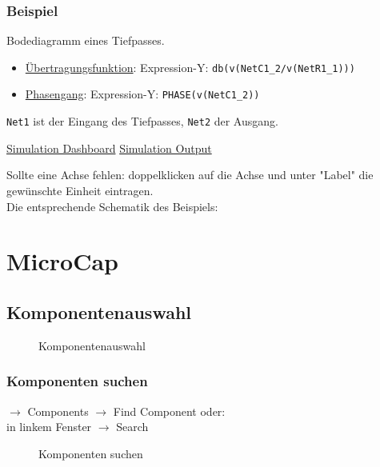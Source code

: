 \begin{itemize}
    \subsubsection*{Beispiel}
    Bodediagramm eines Tiefpasses.

    \begin{itemize}
        \item \underline{Übertragungsfunktion}: Expression-Y: \verb|db(v(NetC1_2/v(NetR1_1)))|
        \item \underline{Phasengang}: Expression-Y: \verb|PHASE(v(NetC1_2))|
    \end{itemize}
    \verb|Net1| ist der Eingang des Tiefpasses, \verb|Net2| der Ausgang.

    \underline{Simulation Dashboard}
    \underline{Simulation Output}

    Sollte eine Achse fehlen: doppelklicken auf die Achse und unter "Label" die gewünschte Einheit eintragen. \\

    Die entsprechende Schematik des Beispiels:
\end{itemize}

\newpage

\section{MicroCap}
\subsection{Komponentenauswahl}
\begin{figure}[h]
    \centering
    \caption{Komponentenauswahl}
    \label{fig:Komponentenauswahl}
\end{figure}

\subsubsection*{Komponenten suchen}
$\rightarrow$ Components $\rightarrow$ Find Component oder:\\
in linkem Fenster $\rightarrow$ Search
\begin{figure}[h]
    \centering
    \caption{Komponenten suchen}
    \label{fig:Komponenten suchen}
\end{figure}

\newpage

